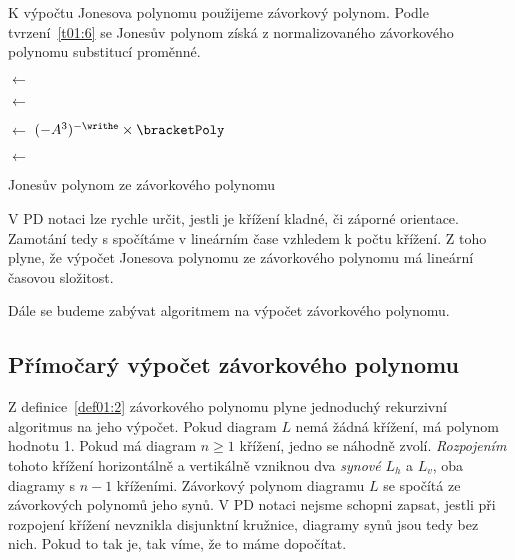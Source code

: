 K výpočtu Jonesova polynomu použijeme závorkový polynom. Podle tvrzení~\ref{t01:6} se Jonesův polynom získá z normalizovaného závorkového polynomu substitucí proměnné. 

\begin{algorithm}[H]
\DontPrintSemicolon
{}


\BlankLine

\bracketPoly $\leftarrow$ 

\writhe $\leftarrow$ 

\normal $\leftarrow$ $ (-A^3)^{-\writhe} \times \bracketPoly$

\jones $\leftarrow$ 

\BlankLine

\KwRet \jones 

\caption{Jonesův polynom ze závorkového polynomu} 
\end{algorithm}

V PD notaci lze rychle určit, jestli je křížení kladné, či záporné orientace. Zamotání tedy s spočítáme v lineárním čase vzhledem k počtu křížení. Z toho plyne, že výpočet Jonesova polynomu ze závorkového polynomu má lineární časovou složitost.

Dále se budeme zabývat algoritmem na výpočet závorkového polynomu.

\subsection{Přímočarý výpočet závorkového polynomu}

Z definice~\ref{def01:2} závorkového polynomu plyne jednoduchý rekurzivní algoritmus na jeho výpočet. Pokud diagram $L$ nemá žádná křížení, má polynom hodnotu 1. Pokud má diagram $n\geq 1$ křížení, jedno se náhodně zvolí. \emph{Rozpojením} tohoto křížení horizontálně a vertikálně vzniknou dva \emph{synové} $L_h$ a $L_v$, oba diagramy s $n-1$ kříženími. Závorkový polynom diagramu $L$ se spočítá ze závorkových polynomů jeho synů.
V PD notaci nejsme schopni zapsat, jestli při rozpojení křížení nevznikla disjunktní kružnice, diagramy synů jsou tedy bez nich. Pokud to tak je, tak víme, že to máme dopočítat.

